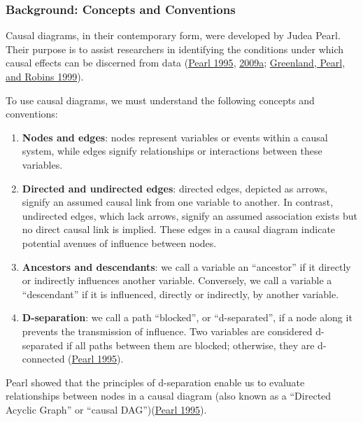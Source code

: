 \documentclass[
  singlecolumn]{article}
\begin{document}
\hypertarget{background-concepts-and-conventions}{%
\subsubsection{Background: Concepts and
Conventions}\label{background-concepts-and-conventions}}

Causal diagrams, in their contemporary form, were developed by Judea
Pearl. Their purpose is to assist researchers in identifying the
conditions under which causal effects can be discerned from data
(\protect\hyperlink{ref-pearl1995}{Pearl 1995},
\protect\hyperlink{ref-pearl2009}{2009a};
\protect\hyperlink{ref-greenland1999}{Greenland, Pearl, and Robins
1999}).

To use causal diagrams, we must understand the following concepts and
conventions:

\begin{enumerate}
\def\labelenumi{\arabic{enumi}.}
\item
  \textbf{Nodes and edges}: nodes represent variables or events within a
  causal system, while edges signify relationships or interactions
  between these variables.
\item
  \textbf{Directed and undirected edges}: directed edges, depicted as
  arrows, signify an assumed causal link from one variable to another.
  In contrast, undirected edges, which lack arrows, signify an assumed
  association exists but no direct causal link is implied. These edges
  in a causal diagram indicate potential avenues of influence between
  nodes.
\item
  \textbf{Ancestors and descendants}: we call a variable an ``ancestor''
  if it directly or indirectly influences another variable. Conversely,
  we call a variable a ``descendant'' if it is influenced, directly or
  indirectly, by another variable.
\item
  \textbf{D-separation}: we call a path ``blocked'', or ``d-separated'',
  if a node along it prevents the transmission of influence. Two
  variables are considered d-separated if all paths between them are
  blocked; otherwise, they are d-connected
  (\protect\hyperlink{ref-pearl1995}{Pearl 1995}).
\end{enumerate}

Pearl showed that the principles of d-separation enable us to evaluate
relationships between nodes in a causal diagram (also known as a
``Directed Acyclic Graph'' or ``causal
DAG'')(\protect\hyperlink{ref-pearl1995}{Pearl 1995}).
\end{document}
